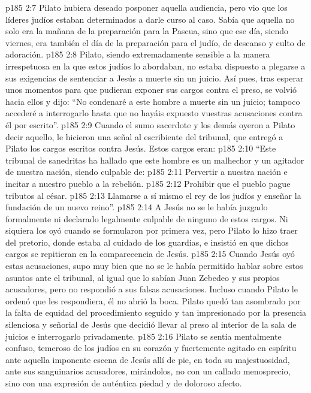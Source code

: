 \vs p185 2:7 \pc Pilato hubiera deseado posponer aquella audiencia, pero vio que los líderes judíos estaban determinados a darle curso al caso. Sabía que aquella no solo era la mañana de la preparación para la Pascua, sino que ese día, siendo viernes, era también el día de la preparación para el  judío, de descanso y culto de adoración.
\vs p185 2:8 Pilato, siendo extremadamente sensible a la manera irrespetuosa en la que estos judíos lo abordaban, no estaba dispuesto a plegarse a sus exigencias de sentenciar a Jesús a muerte sin un juicio. Así pues, tras esperar unos momentos para que pudieran exponer sus cargos contra el preso, se volvió hacia ellos y dijo: “No condenaré a este hombre a muerte sin un juicio; tampoco accederé a interrogarlo hasta que no hayáis expuesto vuestras acusaciones contra él por escrito”.
\vs p185 2:9 Cuando el sumo sacerdote y los demás oyeron a Pilato decir aquello, le hicieron una señal al escribiente del tribunal, que entregó a Pilato los cargos escritos contra Jesús. Estos cargos eran:
\vs p185 2:10 \pc “Este tribunal de sanedritas ha hallado que este hombre es un malhechor y un agitador de nuestra nación, siendo culpable de:
\vs p185 2:11 Pervertir a nuestra nación e incitar a nuestro pueblo a la rebelión.
\vs p185 2:12 Prohibir que el pueblo pague tributos al césar.
\vs p185 2:13 Llamarse a sí mismo el rey de los judíos y enseñar la fundación de un nuevo reino”.
\vs p185 2:14 \pc A Jesús no se le había juzgado formalmente ni declarado legalmente culpable de ninguno de estos cargos. Ni siquiera los oyó cuando se formularon por primera vez, pero Pilato lo hizo traer del pretorio, donde estaba al cuidado de los guardias, e insistió en que dichos cargos se repitieran en la comparecencia de Jesús.
\vs p185 2:15 Cuando Jesús oyó estas acusaciones, supo muy bien que no se le había permitido hablar sobre estos asuntos ante el tribunal, al igual que lo sabían Juan Zebedeo y sus propios acusadores, pero no respondió a sus falsas acusaciones. Incluso cuando Pilato le ordenó que les respondiera, él no abrió la boca. Pilato quedó tan asombrado por la falta de equidad del procedimiento seguido y tan impresionado por la presencia silenciosa y señorial de Jesús que decidió llevar al preso al interior de la sala de juicios e interrogarlo privadamente.
\vs p185 2:16 Pilato se sentía mentalmente confuso, temeroso de los judíos en su corazón y fuertemente agitado en espíritu ante aquella imponente escena de Jesús allí de pie, en toda su majestuosidad, ante sus sanguinarios acusadores, mirándolos, no con un callado menosprecio, sino con una expresión de auténtica piedad y de doloroso afecto.
